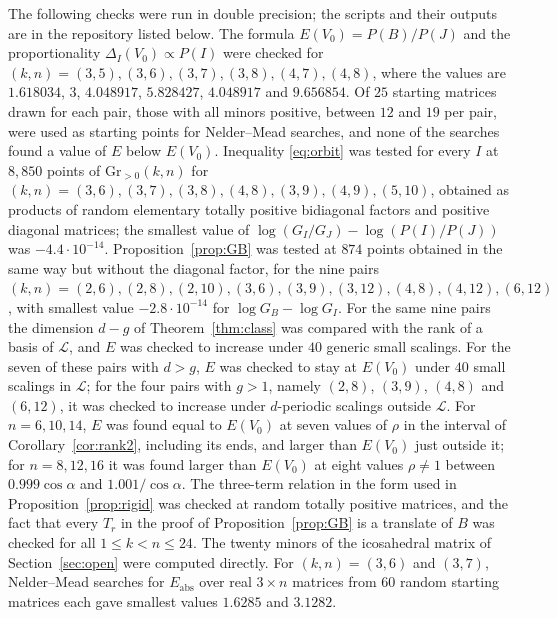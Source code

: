 \documentclass[11pt]{article}
\theoremstyle{remark}
\newcommand{\Gr}{\mathrm{Gr}}
\begin{document}
The following checks were run in double precision; the scripts and their outputs are in the repository listed below. The formula $E(V_0)=P(B)/P(J)$ and the proportionality $\Delta_I(V_0)\propto P(I)$ were checked for $(k,n)=(3,5),(3,6),(3,7),(3,8),(4,7),(4,8)$, where the values are $1.618034$, $3$, $4.048917$, $5.828427$, $4.048917$ and $9.656854$. Of $25$ starting matrices drawn for each pair, those with all minors positive, between $12$ and $19$ per pair, were used as starting points for Nelder--Mead searches, and none of the searches found a value of $E$ below $E(V_0)$. Inequality \eqref{eq:orbit} was tested for every $I$ at $8{,}850$ points of $\Gr_{>0}(k,n)$ for $(k,n)=(3,6),(3,7),(3,8),(4,8),(3,9),(4,9),(5,10)$, obtained as products of random elementary totally positive bidiagonal factors and positive diagonal matrices; the smallest value of $\log(G_I/G_J)-\log(P(I)/P(J))$ was $-4.4\cdot10^{-14}$. Proposition~\ref{prop:GB} was tested at $874$ points obtained in the same way but without the diagonal factor, for the nine pairs $(k,n)=(2,6),(2,8),(2,10),(3,6),(3,9),(3,12),(4,8),(4,12),(6,12)$, with smallest value $-2.8\cdot10^{-14}$ for $\log G_B-\log G_I$. For the same nine pairs the dimension $d-g$ of Theorem~\ref{thm:class} was compared with the rank of a basis of $\mathcal{L}$, and $E$ was checked to increase under $40$ generic small scalings. For the seven of these pairs with $d>g$, $E$ was checked to stay at $E(V_0)$ under $40$ small scalings in $\mathcal{L}$; for the four pairs with $g>1$, namely $(2,8)$, $(3,9)$, $(4,8)$ and $(6,12)$, it was checked to increase under $d$-periodic scalings outside $\mathcal{L}$. For $n=6,10,14$, $E$ was found equal to $E(V_0)$ at seven values of $\rho$ in the interval of Corollary~\ref{cor:rank2}, including its ends, and larger than $E(V_0)$ just outside it; for $n=8,12,16$ it was found larger than $E(V_0)$ at eight values $\rho\ne1$ between $0.999\cos\alpha$ and $1.001/\cos\alpha$. The three-term relation in the form used in Proposition~\ref{prop:rigid} was checked at random totally positive matrices, and the fact that every $T_r$ in the proof of Proposition~\ref{prop:GB} is a translate of $B$ was checked for all $1\le k<n\le24$. The twenty minors of the icosahedral matrix of Section~\ref{sec:open} were computed directly. For $(k,n)=(3,6)$ and $(3,7)$, Nelder--Mead searches for $E_{\mathrm{abs}}$ over real $3\times n$ matrices from $60$ random starting matrices each gave smallest values $1.6285$ and $3.1282$.
\end{document}
